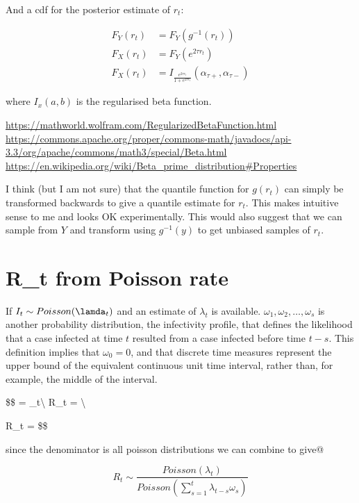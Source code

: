 \documentclass[
]{article}
\begin{document}
And a cdf for the posterior estimate of \(r_t\):

\[
\begin{aligned}
F_Y(r_t) &= F_Y(g^{-1}(r_t))\\
F_X(r_t) &= F_Y(e^{2\tau r_t})\\
F_X(r_t) &= I_{
\frac{e^{2\tau r_t}}{1+e^{2\tau r_t}}}(\alpha_{\tau+},\alpha_{\tau-})
\end{aligned}
\]

where \(I_x(a,b)\) is the regularised beta function.

\url{https://mathworld.wolfram.com/RegularizedBetaFunction.html}
\url{https://commons.apache.org/proper/commons-math/javadocs/api-3.3/org/apache/commons/math3/special/Beta.html}
\url{https://en.wikipedia.org/wiki/Beta_prime_distribution\#Properties}

I think (but I am not sure) that the quantile function for \(g(r_t)\)
can simply be transformed backwards to give a quantile estimate for
\(r_t\). This makes intuitive sense to me and looks OK experimentally.
This would also suggest that we can sample from \(Y\) and transform
using \(g^{-1}(y)\) to get unbiased samples of \(r_t\).

\hypertarget{r_t-from-poisson-rate}{%
\section{R\_t from Poisson rate}\label{r_t-from-poisson-rate}}

If \(I_t \sim Poisson(\lamda_t)\) and an estimate of \(\lambda_t\) is
available. \(\omega_1, \omega_2, \dots, \omega_s\) is another
probability distribution, the infectivity profile, that defines the
likelihood that a case infected at time \(t\) resulted from a case
infected before time \(t-s\). This definition implies that
\(\omega_0 = 0\), and that discrete time measures represent the upper
bound of the equivalent continuous unit time interval, rather than, for
example, the middle of the interval.

\$\$  = \lambda\_t\textbackslash{} R\_t =
\textbackslash{}

R\_t =  \$\$

since the denominator is all poisson distributions we can combine to
give@

\[
R_t \sim \frac{Poisson(\lambda_t)}{Poisson(\sum_{s=1}^t \lambda_{t-s}\omega_s)}
\]
\end{document}
